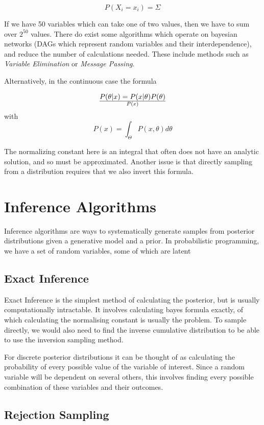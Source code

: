 $$P(X_i=x_i) = \Sigma_{} $$

If we have 50 variables which can take one of two values, then we have to sum over $2^{50}$ values. There do exist some algorithms which operate on bayesian networks (DAGs which represent random variables and their interdependence), and reduce the number of calculations needed. These include methods such as \textit{Variable Elimination} or \textit{Message Passing}.


Alternatively, in the continuous case the formula 

$$P(\theta|x)=P(x|\theta)P(\theta)\over{P(x)}$$
with 
$$ P(x)=\int_{\Theta}P(x,\theta)d\theta $$

The normalizing constant here is an integral that often does not have an analytic solution, and so must be approximated. Another issue is that directly sampling from a distribution requires that we also invert this formula.

\section{Inference Algorithms}
Inference algorithms are ways to systematically generate samples from posterior distributions given a generative model and a prior. In probabilistic programming, we have a set of random variables, some of which are latent 

\subsection{Exact Inference}

Exact Inference is the simplest method of calculating the posterior, but is usually computationally intractable. It involves calculating bayes formula exactly, of which calculating the normalising constant is usually the problem. To sample directly, we would also need to find the inverse cumulative distribution to be able to use the inversion sampling method.

For discrete posterior distributions it can be thought of as calculating the probability of every possible value of the variable of interest. Since a random variable will be dependent on several others, this involves finding every possible combination of these variables and their outcomes.

\subsection{Rejection Sampling}

